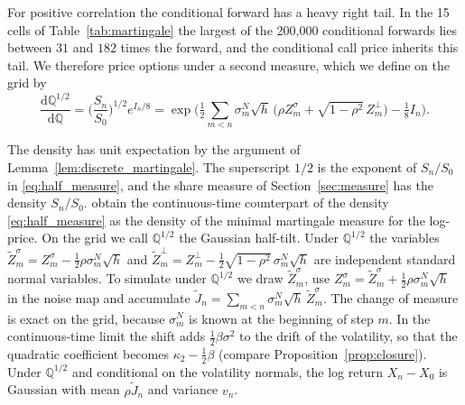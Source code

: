 \documentclass{rQUF2e}
\theoremstyle{plain}
\theoremstyle{definition}
\theoremstyle{remark}
\newcommand{\D}{\mathrm{d}}
\newcommand{\Q}{\mathbb{Q}}
\begin{document}
For positive correlation the conditional forward has a heavy right tail. In the 15 cells of Table~\ref{tab:martingale} the largest of the 200{,}000 conditional forwards lies between $31$ and $182$ times the forward, and the conditional call price inherits this tail. We therefore price options under a second measure, which we define on the grid by
\begin{equation}\label{eq:half_measure}
\frac{\D\Q^{1/2}}{\D\Q}=\Big(\frac{S_n}{S_0}\Big)^{1/2}e^{I_n/8}=\exp\Big(\tfrac12\sum_{m<n}\sigma^N_m\sqrt h\,\Big(\rho Z^\sigma_m+\sqrt{1-\rho^2}\,Z^\perp_m\Big)-\tfrac18I_n\Big).
\end{equation}

The density has unit expectation by the argument of Lemma~\ref{lem:discrete_martingale}. The superscript $1/2$ is the exponent of $S_n/S_0$ in \eqref{eq:half_measure}, and the share measure of Section~\ref{sec:measure} has the density $S_n/S_0$. \citet{RheinlaenderSchmutz2013} obtain the continuous-time counterpart of the density \eqref{eq:half_measure} as the density of the minimal martingale measure for the log-price. On the grid we call $\Q^{1/2}$ the Gaussian half-tilt. Under $\Q^{1/2}$ the variables $\tilde Z^\sigma_m=Z^\sigma_m-\tfrac12\rho\sigma^N_m\sqrt h$ and $\tilde Z^\perp_m=Z^\perp_m-\tfrac12\sqrt{1-\rho^2}\,\sigma^N_m\sqrt h$ are independent standard normal variables. To simulate under $\Q^{1/2}$ we draw $\tilde Z^\sigma_m$, use $Z^\sigma_m=\tilde Z^\sigma_m+\tfrac12\rho\sigma^N_m\sqrt h$ in the noise map and accumulate $\tilde J_n=\sum_{m<n}\sigma^N_m\sqrt h\,\tilde Z^\sigma_m$. The change of measure is exact on the grid, because $\sigma^N_m$ is known at the beginning of step $m$. In the continuous-time limit the shift adds $\tfrac12\beta\sigma^2$ to the drift of the volatility, so that the quadratic coefficient becomes $\kappa_2-\tfrac12\beta$ (compare Proposition~\ref{prop:closure}). Under $\Q^{1/2}$ and conditional on the volatility normals, the log return $X_n-X_0$ is Gaussian with mean $\rho\tilde J_n$ and variance $v_n$.
\end{document}
